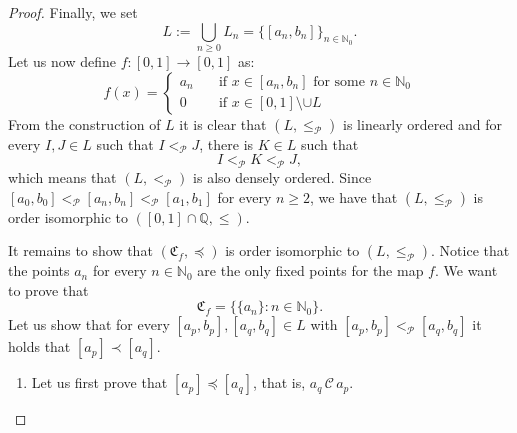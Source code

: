 \documentclass[10pt,a4paper]{amsart}
\begin{document}
\begin{proof}
\noindent Finally, we set 
\[
L:=\bigcup_{n\geq 0}L_n=\{[a_n,b_n]\}_{n\in\mathbb{N}_0}.
\]
Let us now define $f:[0,1]\to [0,1]$ as:
\begin{equation}\label{dis_func}
    f(x)=
    \begin{cases}
        a_n &\quad\text{if } x\in[a_n,b_n] \text{ for some }n\in\mathbb{N}_0\\
        0 &\quad\text{if } x\in[0,1]\setminus \cup L
    \end{cases}
\end{equation}
From the construction of $L$ it is clear that $(L,\le_\mathcal{P})$ is linearly ordered and for every $I, J\in L$ such that $I<_\mathcal{P} J$, there is $K\in L$ such that
\[
I<_\mathcal{P} K<_\mathcal{P} J,
\]
which means that $(L,<_\mathcal{P})$ is also densely ordered.
Since $[a_0,b_0]<_\mathcal{P} [a_n,b_n]<_\mathcal{P} [a_1,b_1]$ for every $n\ge2$, we have that $(L,\le_\mathcal{P})$ is order isomorphic to $([0,1]\cap \mathbb{Q}, \leq)$.

\noindent It remains to show that $(\mathfrak{C}_f,\preceq)$ is order isomorphic to $(L,\le_\mathcal{P})$.
Notice that the points $a_n$ for every $n\in\mathbb{N}_0$ are the only fixed points for the map $f$.
We want to prove that
$$
\mathfrak{C}_f=
\{\{a_n\}: n\in\mathbb{N}_0\}.
$$
\noindent Let us show that for every $[a_p,b_p],[a_q,b_q]\in L$ with $[a_p,b_p]<_\mathcal{P} [a_q,b_q]$ it holds that $[a_p]\prec [a_q]$.
\begin{enumerate}
\item Let us first prove that $[a_p]\preceq [a_q]$, that is, $a_q\,\mathcal{C}\, a_p$.   


\end{enumerate}
\end{proof}
\end{document}
